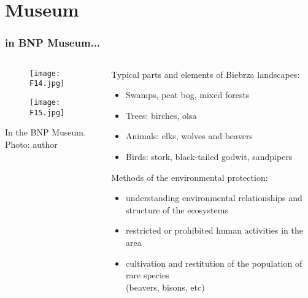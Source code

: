 \documentclass[pdflatex,compress,8pt,
	xcolor={dvipsnames,dvipsnames,svgnames,x11names,table},
	hyperref={colorlinks = true,
	breaklinks = true, urlcolor = NavyBlue, breaklinks = true}]{beamer}
\begin{document}
\section{Museum}
\begin{frame}\frametitle{in BNP Museum...}
\begin{minipage}[0.4\textheight]{\textwidth}
\begin{columns}[T]
\begin{column}{0.5\textwidth}
\begin{figure}[H]
	\centering
		\texttt{[image: F14.jpg]}
\end{figure}
\begin{figure}[H]
	\centering
		\texttt{[image: F15.jpg]}
\end{figure}
\footnotesize{In the BNP Museum. Photo: author}
\end{column}
\begin{column}{0.5\textwidth}
\vspace{2em} 
Typical parts and elements of Biebrza landscapes:
\begin{itemize}
	\item Swamps, peat bog, mixed forests
	\item Trees: birches, olsa
	\item Animals: elks, wolves and beavers
	\item Birds: stork, black-tailed godwit, sandpipers
\end{itemize}
Methods of the environmental protection:
\begin{itemize}
	\item understanding environmental relationships and structure of the ecosystems
	\item restricted or prohibited human activities in the area
	\item cultivation and restitution of the population of rare species \\(beavers, bisons, etc)
\end{itemize}
\end{column}
\end{columns}
\end{minipage}
\end{frame}
\end{document}
